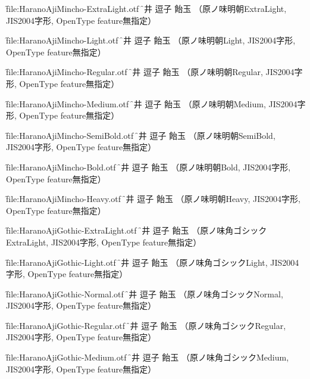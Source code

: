 

\nopagenumbers

\font\f{file:HaranoAjiMincho-ExtraLight.otf} \f
辻井 逗子 飴玉 （原ノ味明朝ExtraLight, JIS2004字形,
OpenType feature無指定）\par

\font\f{file:HaranoAjiMincho-Light.otf} \f
辻井 逗子 飴玉 （原ノ味明朝Light, JIS2004字形,
OpenType feature無指定）\par

\font\f{file:HaranoAjiMincho-Regular.otf} \f
辻井 逗子 飴玉 （原ノ味明朝Regular, JIS2004字形,
OpenType feature無指定）\par

\font\f{file:HaranoAjiMincho-Medium.otf} \f
辻井 逗子 飴玉 （原ノ味明朝Medium, JIS2004字形,
OpenType feature無指定）\par

\font\f{file:HaranoAjiMincho-SemiBold.otf} \f
辻井 逗子 飴玉 （原ノ味明朝SemiBold, JIS2004字形,
OpenType feature無指定）\par

\font\f{file:HaranoAjiMincho-Bold.otf} \f
辻井 逗子 飴玉 （原ノ味明朝Bold, JIS2004字形,
OpenType feature無指定）\par

\font\f{file:HaranoAjiMincho-Heavy.otf} \f
辻井 逗子 飴玉 （原ノ味明朝Heavy, JIS2004字形,
OpenType feature無指定）\par


\font\f{file:HaranoAjiGothic-ExtraLight.otf} \f
辻井 逗子 飴玉 （原ノ味角ゴシックExtraLight, JIS2004字形,
OpenType feature無指定）\par

\font\f{file:HaranoAjiGothic-Light.otf} \f
辻井 逗子 飴玉 （原ノ味角ゴシックLight, JIS2004字形,
OpenType feature無指定）\par

\font\f{file:HaranoAjiGothic-Normal.otf} \f
辻井 逗子 飴玉 （原ノ味角ゴシックNormal, JIS2004字形,
OpenType feature無指定）\par

\font\f{file:HaranoAjiGothic-Regular.otf} \f
辻井 逗子 飴玉 （原ノ味角ゴシックRegular, JIS2004字形,
OpenType feature無指定）\par

\font\f{file:HaranoAjiGothic-Medium.otf} \f
辻井 逗子 飴玉 （原ノ味角ゴシックMedium, JIS2004字形,
OpenType feature無指定）\par

